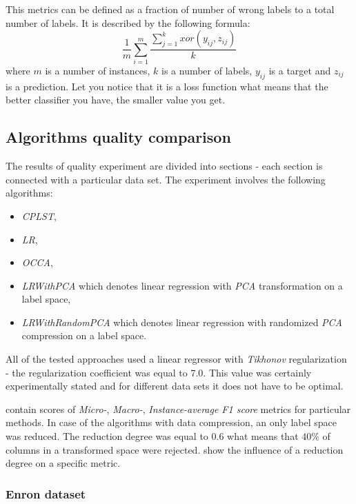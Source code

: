 This metrics can be defined as a fraction of number of wrong labels to a total number of labels. It is described by the following formula:
\begin{equation}
\label{eq:exp1}
    \frac{1}{m}\sum\limits_{i=1}^{m}\frac{\sum\limits_{j=1}^{k}xor(y_{ij}, z_{ij})}{k}
\end{equation}
where $m$ is a number of instances, $k$ is a number of labels, $y_{ij}$ is a target and $z_{ij}$ is a prediction. Let you notice that it is a loss function what means that the better classifier you have, the smaller value you get.  

\subsection{Algorithms quality comparison}

The results of quality experiment are divided into sections - each section is connected with a particular data set. The experiment involves the following algorithms:
\begin{itemize}
    \item \textit{CPLST},
    \item \textit{LR},
    \item \textit{OCCA},
    \item \textit{LRWithPCA} which denotes linear regression with \textit{PCA} transformation on a label space,
    \item \textit{LRWithRandomPCA} which denotes linear regression with randomized \textit{PCA} compression on a label space.
\end{itemize}
All of the tested approaches used a linear regressor with \textit{Tikhonov} regularization - the regularization coefficient was equal to $7.0$. This value was certainly experimentally stated and for different data sets it does not have to be optimal.  

 contain scores of \textit{Micro-}, \textit{Macro-}, \textit{Instance-average F1 score} metrics for particular methods. In case of the algorithms with data compression, an only label space was reduced. The reduction degree was equal to $0.6$ what means that $40\%$ of columns in a transformed space were rejected.
 show the influence of a reduction degree on a specific metric. 

\newpage
\subsubsection{Enron dataset}

